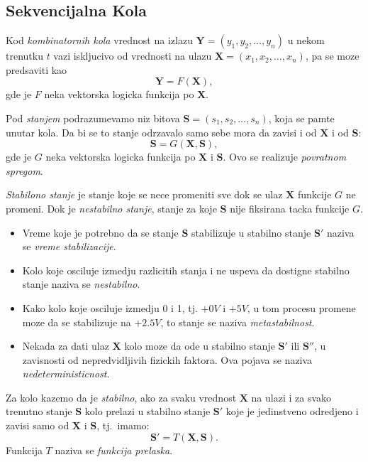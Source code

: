 \documentclass[12p,a4paper]{article}
\begin{document}
\begin{multicols}{2}
    \section{Sekvencijalna Kola}

    Kod \emph{kombinatornih kola} vrednost na izlazu 
    $\mathbf{Y} = (y_1, y_2, \ldots, y_n)$ u nekom trenutku $t$ vazi 
    iskljucivo od vrednosti na ulazu $\mathbf{X} = (x_1, x_2, \ldots, x_n)$, 
    pa se moze predsaviti kao
    \[
        \mathbf{Y} = F(\mathbf{X}),
    \]
    gde je $F$ neka vektorska logicka funkcija po $\mathbf{X}$.

    Pod \emph{stanjem} podrazumevamo niz bitova 
    $\mathbf{S} = (s_1, s_2, \ldots, s_n)$, koja se pamte unutar kola.
    Da bi se to stanje odrzavalo samo sebe mora da zavisi i od $\mathbf{X}$ i 
    od $\mathbf{S}$:
    \[
        \mathbf{S} = G(\mathbf{X}, \mathbf{S}),
    \]
    gde je $G$ neka vektorska logicka funkcija po $\mathbf{X}$ i $\mathbf{S}$.
    Ovo se realizuje \emph{povratnom spregom}.
    
    \emph{Stabilono stanje} je stanje koje se nece promeniti sve dok se ulaz
    $\mathbf{X}$ funkcije $G$ ne promeni. Dok je \emph{nestabilno stanje}, 
    stanje za koje $\mathbf{S}$ nije fiksirana tacka funkcije $G$.

    \begin{itemize}
        \itemsep0em
        \item Vreme koje je potrebno da se stanje $\mathbf{S}$ stabilizuje u
              stabilno stanje $\mathbf{S'}$ naziva se 
              \emph{vreme stabilizacije}.
        \item Kolo koje osciluje izmedju razlicitih stanja i ne uspeva da 
              dostigne stabilno stanje naziva se \emph{nestabilno}.
        \item Kako kolo koje osciluje izmedju 0 i 1, tj. $+0V$ i $+5V$, u tom
              procesu promene moze da se stabilizuje na $+2.5V$, to stanje
              se naziva \emph{metastabilnost}.
        \item Nekada za dati ulaz $\mathbf{X}$ kolo moze da ode u stabilno 
              stanje $\mathbf{S'}$ ili $\mathbf{S''}$, u zavisnosti od 
              nepredvidljivih fizickih faktora. Ova pojava se naziva 
              \emph{nedeterministicnost}.
    \end{itemize}

    Za kolo kazemo da je \emph{stabilno}, ako za svaku vrednost $\mathbf{X}$ 
    na ulazi i za svako trenutno stanje $\mathbf{S}$ kolo prelazi u stabilno
    stanje $\mathbf{S'}$ koje je jedinstveno odredjeno i zavisi samo od 
    $\mathbf{X}$ i $\mathbf{S}$, tj.\ imamo:
    \[
        \mathbf{S'} = T(\mathbf{X}, \mathbf{S}).
    \]
    Funkcija $T$ naziva se \emph{funkcija prelaska}.


\end{multicols}
\end{document}
